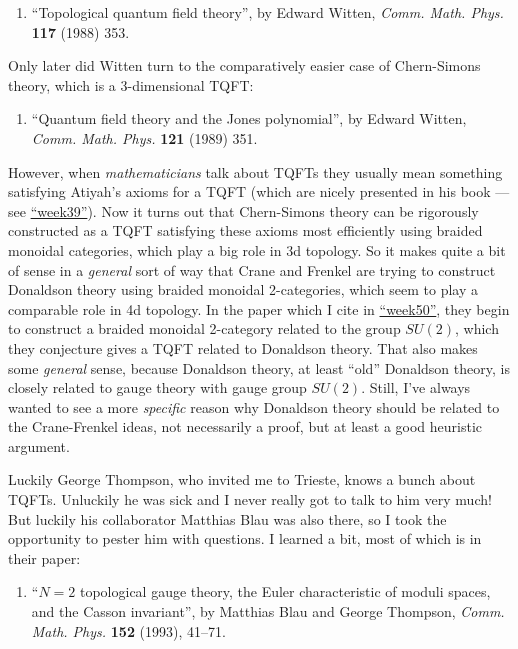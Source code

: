 \documentclass{article}
\def\tightlist{}
\begin{document}
\begin{enumerate}
\def\labelenumi{\arabic{enumi})}
\tightlist
\item
  ``Topological quantum field theory'', by Edward Witten, \emph{Comm.
  Math. Phys.} \textbf{117} (1988) 353.
\end{enumerate}

Only later did Witten turn to the comparatively easier case of
Chern-Simons theory, which is a 3-dimensional TQFT:

\begin{enumerate}
\def\labelenumi{\arabic{enumi})}
\setcounter{enumi}{1}
\tightlist
\item
  ``Quantum field theory and the Jones polynomial'', by Edward Witten,
  \emph{Comm. Math. Phys.} \textbf{121} (1989) 351.
\end{enumerate}

However, when \emph{mathematicians} talk about TQFTs they usually mean
something satisfying Atiyah's axioms for a TQFT (which are nicely
presented in his book --- see \protect\hyperlink{week39}{``week39''}).
Now it turns out that Chern-Simons theory can be rigorously constructed
as a TQFT satisfying these axioms most efficiently using braided
monoidal categories, which play a big role in 3d topology. So it makes
quite a bit of sense in a \emph{general} sort of way that Crane and
Frenkel are trying to construct Donaldson theory using braided monoidal
2-categories, which seem to play a comparable role in 4d topology. In
the paper which I cite in \protect\hyperlink{week50}{``week50''}, they
begin to construct a braided monoidal 2-category related to the group
\(SU(2)\), which they conjecture gives a TQFT related to Donaldson
theory. That also makes some \emph{general} sense, because Donaldson
theory, at least ``old'' Donaldson theory, is closely related to gauge
theory with gauge group \(SU(2)\). Still, I've always wanted to see a
more \emph{specific} reason why Donaldson theory should be related to
the Crane-Frenkel ideas, not necessarily a proof, but at least a good
heuristic argument.

Luckily George Thompson, who invited me to Trieste, knows a bunch about
TQFTs. Unluckily he was sick and I never really got to talk to him very
much! But luckily his collaborator Matthias Blau was also there, so I
took the opportunity to pester him with questions. I learned a bit, most
of which is in their paper:

\begin{enumerate}
\def\labelenumi{\arabic{enumi})}
\setcounter{enumi}{2}
\tightlist
\item
  ``\(N = 2\) topological gauge theory, the Euler characteristic of
  moduli spaces, and the Casson invariant'', by Matthias Blau and George
  Thompson, \emph{Comm. Math. Phys.} \textbf{152} (1993), 41--71.
\end{enumerate}
\end{document}
